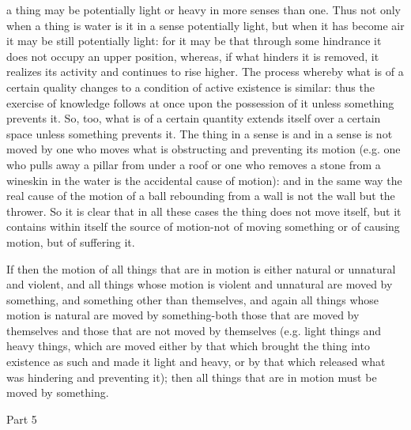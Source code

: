 a thing may be potentially light or heavy in more senses than one.
Thus not only when a thing is water is it in a sense potentially light,
but when it has become air it may be still potentially light: for
it may be that through some hindrance it does not occupy an upper
position, whereas, if what hinders it is removed, it realizes its
activity and continues to rise higher. The process whereby what is
of a certain quality changes to a condition of active existence is
similar: thus the exercise of knowledge follows at once upon the possession
of it unless something prevents it. So, too, what is of a certain
quantity extends itself over a certain space unless something prevents
it. The thing in a sense is and in a sense is not moved by one who
moves what is obstructing and preventing its motion (e.g. one who
pulls away a pillar from under a roof or one who removes a stone from
a wineskin in the water is the accidental cause of motion): and in
the same way the real cause of the motion of a ball rebounding from
a wall is not the wall but the thrower. So it is clear that in all
these cases the thing does not move itself, but it contains within
itself the source of motion-not of moving something or of causing
motion, but of suffering it. 

If then the motion of all things that are in motion is either natural
or unnatural and violent, and all things whose motion is violent and
unnatural are moved by something, and something other than themselves,
and again all things whose motion is natural are moved by something-both
those that are moved by themselves and those that are not moved by
themselves (e.g. light things and heavy things, which are moved either
by that which brought the thing into existence as such and made it
light and heavy, or by that which released what was hindering and
preventing it); then all things that are in motion must be moved by
something. 

Part 5

